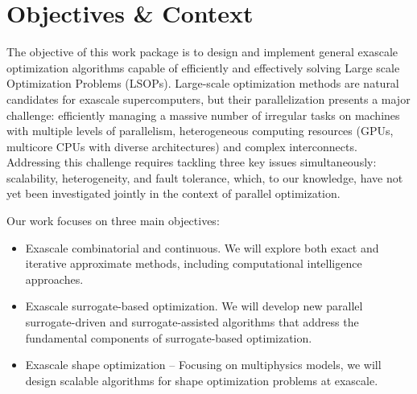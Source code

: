 
\section{Objectives \& Context}
The objective of this work package is to design and implement general exascale optimization algorithms capable of efficiently and effectively solving Large scale Optimization Problems (LSOPs). Large-scale optimization methods are natural candidates for exascale supercomputers, but their parallelization presents a major challenge: efficiently managing a massive number of irregular tasks on machines with multiple levels of parallelism, heterogeneous computing resources (GPUs, multicore CPUs with diverse architectures) and complex interconnects. Addressing this challenge requires tackling three key issues simultaneously: scalability, heterogeneity, and fault tolerance, which, to our knowledge, have not yet been investigated jointly in the context of parallel optimization.

Our work focuses on three main objectives:
\begin{itemize}
\item Exascale combinatorial and continuous. We will explore both exact and iterative approximate methods, including computational intelligence approaches.

\item Exascale surrogate-based optimization. We will develop new parallel surrogate-driven and surrogate-assisted algorithms that address the fundamental components of surrogate-based optimization.

\item Exascale shape optimization – Focusing on multiphysics models, we will design scalable algorithms for shape optimization problems at exascale.

\end{itemize}

